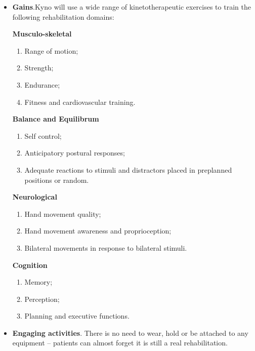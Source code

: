 \begin{itemize}
\item \textbf{Gains}.Kyno will use a wide range of kinetotherapeutic exercises to train the following rehabilitation domains:

\textbf{Musculo-skeletal}
\begin{enumerate}
\item Range of motion;
\item Strength;
\item Endurance;
\item Fitness and cardiovascular training.
\end{enumerate}


\textbf{Balance and Equilibrum}
\begin{enumerate}
\item Self control;
\item Anticipatory postural responses;
\item Adequate reactions to stimuli and distractors placed in preplanned positions or random.
\end{enumerate}


\textbf{Neurological}
\begin{enumerate}
\item Hand movement quality;
\item Hand movement awareness and proprioception;
\item Bilateral movements in response to bilateral stimuli.
\end{enumerate}

\textbf{Cognition}
\begin{enumerate}
\item Memory;
\item Perception;
\item Planning and executive functions.
\end{enumerate}

\item \textbf{Engaging activities}. There is no
need to wear, hold or be attached to any
equipment – patients can almost forget it is
still a real rehabilitation.
\end{itemize}




\clearpage